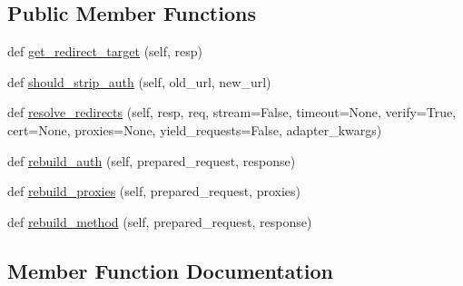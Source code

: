 \subsection*{Public Member Functions}
\begin{DoxyCompactItemize}
\item 
def \hyperlink{classpip_1_1__vendor_1_1requests_1_1sessions_1_1SessionRedirectMixin_ad72f751ba39c68618a6ce59c954396ab}{get\+\_\+redirect\+\_\+target} (self, resp)
\item 
def \hyperlink{classpip_1_1__vendor_1_1requests_1_1sessions_1_1SessionRedirectMixin_af96b42ec7e6b8c835c10691462048866}{should\+\_\+strip\+\_\+auth} (self, old\+\_\+url, new\+\_\+url)
\item 
def \hyperlink{classpip_1_1__vendor_1_1requests_1_1sessions_1_1SessionRedirectMixin_a313de3c5e20d7dc2fa505cd54eae94f4}{resolve\+\_\+redirects} (self, resp, req, stream=False, timeout=None, verify=True, cert=None, proxies=None, yield\+\_\+requests=False, adapter\+\_\+kwargs)
\item 
def \hyperlink{classpip_1_1__vendor_1_1requests_1_1sessions_1_1SessionRedirectMixin_a7ca2c1256548ecea54e4179c575f5497}{rebuild\+\_\+auth} (self, prepared\+\_\+request, response)
\item 
def \hyperlink{classpip_1_1__vendor_1_1requests_1_1sessions_1_1SessionRedirectMixin_a2a67ad5a8d6f5df4156952713771c761}{rebuild\+\_\+proxies} (self, prepared\+\_\+request, proxies)
\item 
def \hyperlink{classpip_1_1__vendor_1_1requests_1_1sessions_1_1SessionRedirectMixin_a1ec2403f239b1996358ad437afd18101}{rebuild\+\_\+method} (self, prepared\+\_\+request, response)
\end{DoxyCompactItemize}


\subsection{Member Function Documentation}
\mbox{\label{classpip_1_1__vendor_1_1requests_1_1sessions_1_1SessionRedirectMixin_ad72f751ba39c68618a6ce59c954396ab}} 
